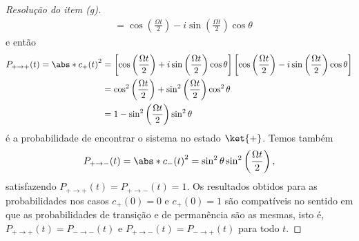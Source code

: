 \begin{proof}[Resolução do item (g)]
\begin{align*}
               &= \cos\left(\frac{\Omega t}{2}\right) - i \sin\left(\frac{\Omega t}{2}\right)\cos\theta
    \end{align*}
    e então
    \begin{align*}
        P_{+\to+}(t) = \abs*{c_+(t)}^2 &= \left[\cos\left(\frac{\Omega t}{2}\right) + i \sin\left(\frac{\Omega t}{2}\right)\cos\theta\right]\left[\cos\left(\frac{\Omega t}{2}\right) - i \sin\left(\frac{\Omega t}{2}\right)\cos\theta\right]\\
                                 &= \cos^2\left(\frac{\Omega t}{2}\right) + \sin^2\left(\frac{\Omega t}{2}\right)\cos^2\theta\\
                                 &= 1 - \sin^2\left(\frac{\Omega t}{2}\right)\sin^2\theta
    \end{align*}
    é a probabilidade de encontrar o sistema no estado \(\ket{+}\). Temos também
    \begin{align*}
        P_{+\to-}(t) = \abs*{c_-(t)}^2 = \sin^2\theta \sin^2\left(\frac{\Omega t}{2}\right),
    \end{align*}
    satisfazendo \(P_{+\to+}(t) = P_{+\to-}(t) = 1\). Os resultados obtidos para as probabilidades nos casos \(c_+(0) = 0\) e \(c_+(0) = 1\) são compatíveis no sentido em que as probabilidades de transição e de permanência são as mesmas, isto é, \(P_{+\to+}(t) = P_{-\to-}(t)\) e \(P_{+\to-}(t) = P_{-\to+}(t)\) para todo \(t\).
\end{proof}

